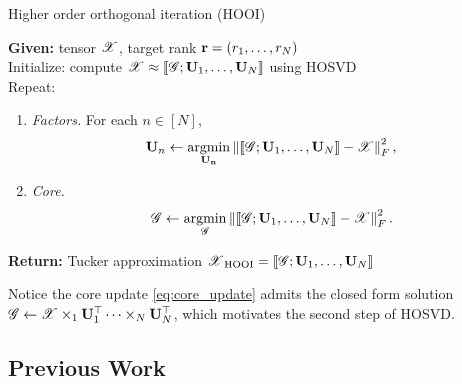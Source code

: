 \begin{algorithm}[ht]
	\caption{Higher order orthogonal iteration (HOOI)
	\citep{de2000multilinear}
	\label{alg:hooi}}
	\textbf{Given:} tensor $\T{X}$, target rank $\mathbf{r} = (r_1, \ldots, r_N)$ \\
	Initialize: compute $\T{X} \approx \llbracket\T{G}; \M{U}_1, \ldots, \M{U}_N \rrbracket$ using HOSVD \\
	Repeat:
\begin{enumerate}
	\item \emph{Factors.} For each $n \in [N]$,
	\begin{equation}
	\label{eq:factor-update}
	\mathbf{U}_n \leftarrow \argmin_{ \M{U_n} }
	\left\| \llbracket\T{G}; \M{U}_1, \ldots, \M{U}_N \rrbracket - \T{X} \right\|_F^2,
	\end{equation}
	\item \emph{Core.}
	\begin{equation}
	\label{eq:core_update}
	\T{G} \leftarrow \argmin_{\T{G}} %
	\left\| \llbracket\T{G}; \M{U}_1, \ldots, \M{U}_N \rrbracket - \T{X} \right\|_F^2.
	\end{equation}
\end{enumerate}
\textbf{Return:} Tucker approximation $\T{X}_{\rm{HOOI}} = \llbracket\T{G}; \M{U}_1, \ldots, \M{U}_N \rrbracket$
\end{algorithm}
Notice the core update \eqref{eq:core_update}
admits the closed form solution
$\T{G} \leftarrow \T{X}\times_1 \mathbf{U}_1^\top \cdots \times_N \mathbf{U}_N^\top$,
which motivates the second step of HOSVD.

\subsection{Previous Work}\label{sec: previous_work}


